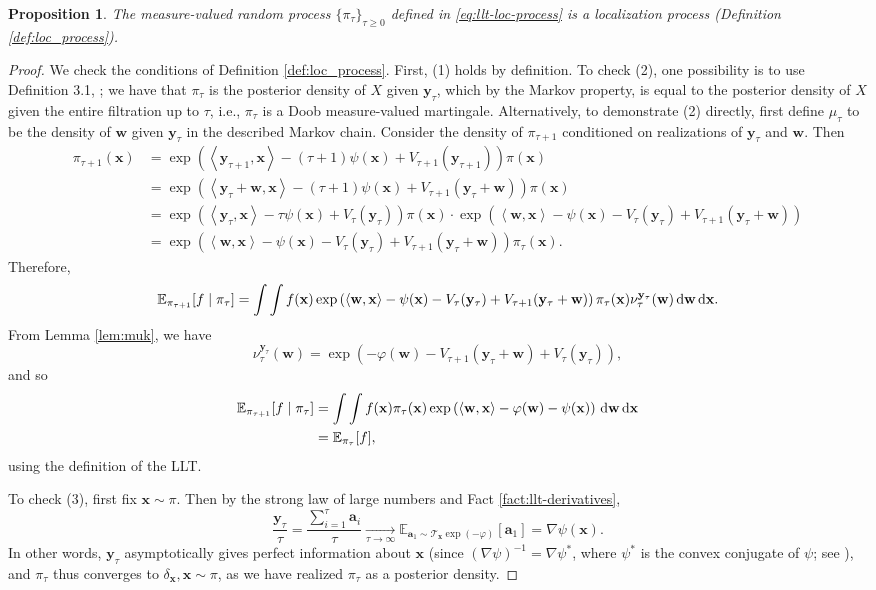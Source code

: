 \documentclass[11pt]{article}
\newtheorem{proposition}{Proposition}
\newcommand{\inprod}[2]{\left\langle#1, #2\right\rangle}
\newcommand{\dd}{\textup{d}}
\newcommand{\Par}[1]{\left(#1\right)}
\newcommand{\0}{\mathbf{0}}
\newcommand{\1}{\mathbf{1}}
\newcommand{\va}{\mathbf{a}}
\newcommand{\vw}{\mathbf{w}}
\newcommand{\vx}{\mathbf{x}}
\newcommand{\vy}{\mathbf{y}}
\begin{document}
\begin{proposition}\label{prop:localization}
    The measure-valued random process $\{\pi_\tau\}_{\tau\geq 0}$ defined in \eqref{eq:llt-loc-process} is a localization process (Definition \ref{def:loc_process}).
\end{proposition}
\begin{proof}
    We check the conditions of Definition \ref{def:loc_process}. First, (1) holds by definition.  To check (2), one possibility is to use Definition 3.1, \cite{Montanari25}; we have that $\pi_\tau$ is the posterior density of $X$ given $\vy_{\tau}$, which by the Markov property, is equal to the posterior density of $X$ given the entire filtration up to $\tau$, i.e., $\pi_\tau$ is a Doob measure-valued martingale.  Alternatively, to demonstrate (2) directly, first define $\mu_\tau$ to be the density of $\vw$ given $\vy_{\tau}$ in the described Markov chain.  Consider the density of $\pi_{\tau+1}$ conditioned on realizations of $\vy_{\tau}$ and $\vw$.  Then
    \begin{align*}
        \pi_{\tau+1}(\vx)
        &=\exp\Par{\inprod{\vy_{\tau+1}}{\vx}-(\tau+1)\psi(\vx)+V_{\tau+1}(\vy_{\tau+1})}\pi(\vx)\\
        &=\exp\Par{\inprod{\vy_{\tau}+\vw}{\vx}-(\tau+1)\psi(\vx)+V_{\tau+1}(\vy_\tau+\vw)}\pi(\vx)\\
        &=\exp\Par{\inprod{\vy_{\tau}}{\vx}-\tau\psi(\vx)+V_{\tau}(\vy_\tau)}\pi(\vx)\cdot \exp\Par{\inprod{\vw}{\vx}-\psi(\vx)-V_\tau(\vy_\tau)+V_{\tau+1}(\vy_\tau+\vw)}\\
        &=\exp\Par{\inprod{\vw}{\vx}-\psi(\vx)-V_\tau(\vy_\tau)+V_{\tau+1}(\vy_\tau+\vw)}  \pi_\tau(\vx).
    \end{align*}
    Therefore, 
    \[
        \mathbb{E}_{\pi_{\tau+1}}[f\mid \pi_\tau]
        =\int \int  f(\vx) \exp\Par{\inprod{\vw}{\vx}-\psi(\vx)-V_\tau(\vy_\tau)+V_{\tau+1}(\vy_\tau+\vw)}  \pi_\tau(\vx) \nu^{\vy_\tau}_\tau(\vw)\,\dd\vw\,\dd\vx.
    \]
    From Lemma \ref{lem:muk}, we have 
    \[\nu^{\vy_\tau}_\tau(\vw)=\exp(-\varphi(\vw)-V_{\tau+1}(\vy_\tau+\vw)+V_\tau(\vy_\tau)),\]
    and so
    \begin{align*}
        \mathbb{E}_{\pi_{\tau+1}}[f\mid \pi_\tau]
        &=\int \int f(\vx)\pi_{\tau}(\vx) \exp\Par{\inprod{\vw}{\vx}-\varphi(\vw)-\psi(\vx)}\,\dd\vw\,\dd\vx\\
        &=\mathbb{E}_{\pi_\tau}[f],
    \end{align*}
    using the definition of the LLT.
    
    To check (3), first fix $\vx\sim \pi$.  Then by the strong law of large numbers and Fact \ref{fact:llt-derivatives},
    \[\frac{\vy_\tau}{\tau}=\frac{\sum_{i=1}^\tau \va_i}{\tau}\xrightarrow[\tau\to\infty]{}\mathbb{E}_{\va_1\sim \mathcal{T}_{\vx}\exp(-\varphi)}[\va_1]=\nabla \psi(\vx).\]
    In other words, $\vy_\tau$ asymptotically gives perfect information about $\vx$ (since $\Par{\nabla \psi}^{-1}=\nabla \psi^*$, where $\psi^*$ is the convex conjugate of $\psi$; see \cite{BubeckE19}), and $\pi_\tau$ thus converges to $\delta_{\vx}, \vx\sim \pi$, as we have realized $\pi_\tau$ as a posterior density.
\end{proof}
\end{document}

